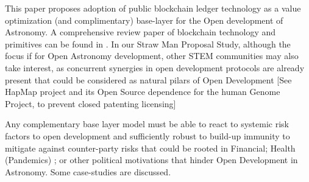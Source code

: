 \documentclass[final,5p,times,twocolumn,authoryear]{elsarticle}
\begin{document}
This paper proposes adoption of public blockchain ledger technology as a value optimization (and complimentary) base-layer for the Open development of Astronomy. A comprehensive review paper of blockchain technology and primitives can be found in \cite{20d30b4efb014b21b7ab27f5218692ab}. In our Straw Man Proposal Study, although the focus if for Open Astronomy development, other STEM communities may also take interest, as concurrent synergies in open development protocols are already present that could be considered as natural pilars of Open Development [See HapMap project and its Open Source dependence for the human Genome Project, \cite{GITTER2008529} to prevent closed patenting licensing]

Any complementary base layer model must be able to react to systemic risk factors to open development and sufficiently robust to build-up immunity to mitigate against counter-party risks that could be rooted in Financial; Health (Pandemics) ; or other political motivations that hinder Open Development in Astronomy. Some case-studies are discussed. 




\end{document}
